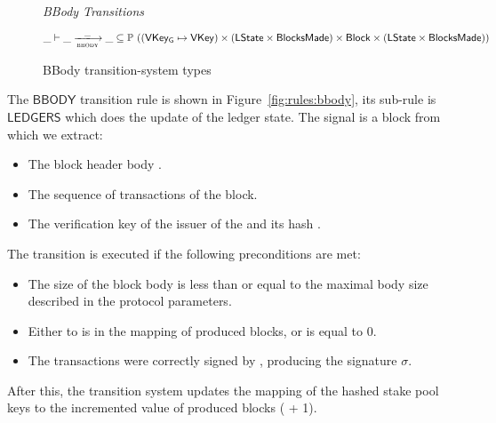 \begin{figure}
  \emph{BBody Transitions}

  \begin{equation*}
    \_ \vdash \var{\_} \trans{bbody}{\_} \var{\_} \subseteq
    \powerset ((\VKeyGen\mapsto\VKey) \times (\LState\times\BlocksMade)
    \times \Block \times (\LState\times\BlocksMade))
  \end{equation*}
  \caption{BBody transition-system types}
  \label{fig:ts-types:bbody}
\end{figure}

The $\mathsf{BBODY}$ transition rule is shown in Figure~\ref{fig:rules:bbody},
its sub-rule is $\mathsf{LEDGERS}$ which does the update of the ledger
state. The signal is a block from which we extract:

\begin{itemize}
\item The block header body .
\item The sequence of transactions  of the block.
\item The verification key  of the issuer of the  and its
  hash .
\end{itemize}

The transition is executed if the following preconditions are met:

\begin{itemize}
\item The size of the block body is less than or equal to the maximal body size
  described in the protocol parameters.
\item Either  to  is in the mapping of produced blocks, or
   is equal to 0.
\item The transactions  were correctly signed by , producing
  the signature $\sigma$.
\end{itemize}

After this, the transition system updates the mapping of the hashed stake pool
keys to the incremented value of produced blocks ( + 1).

